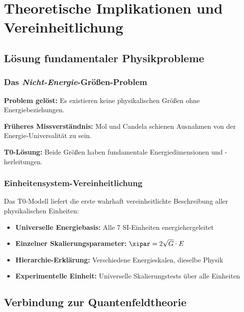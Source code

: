 	\section{Theoretische Implikationen und Vereinheitlichung}
	\label{sec:theoretische_implikationen}
	
	\subsection{Lösung fundamentaler Physikprobleme}
	\label{subsec:loesung_fundamentaler_probleme}
	
	\subsubsection{Das \textit{Nicht-Energie}-Größen-Problem}
	\label{subsubsec:nicht_energie_problem_geloest}
	
	\textbf{Problem gelöst:} Es existieren keine physikalischen Größen ohne Energiebeziehungen.
	
	\textbf{Früheres Missverständnis:} Mol und Candela schienen Ausnahmen von der Energie-Universalität zu sein.
	
	\textbf{T0-Lösung:} Beide Größen haben fundamentale Energiedimensionen und -herleitungen.
	
	\subsubsection{Einheitensystem-Vereinheitlichung}
	\label{subsubsec:einheitensystem_vereinheitlichung}
	
	Das T0-Modell liefert die erste wahrhaft vereinheitlichte Beschreibung aller physikalischen Einheiten:
	
	\begin{itemize}
		\item \textbf{Universelle Energiebasis:} Alle 7 SI-Einheiten energiehergeleitet
		\item \textbf{Einzelner Skalierungsparameter:} $\xipar = 2\sqrt{G} \cdot E$
		\item \textbf{Hierarchie-Erklärung:} Verschiedene Energieskalen, dieselbe Physik
		\item \textbf{Experimentelle Einheit:} Universelle Skalierungstests über alle Einheiten
	\end{itemize}
	
	\subsection{Verbindung zur Quantenfeldtheorie}
	\label{subsec:qft_verbindung}
	
